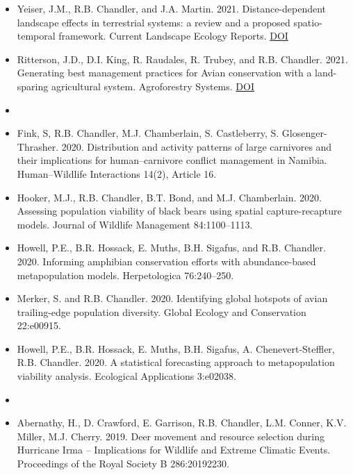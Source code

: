 \documentclass[12pt]{article}
\begin{document}
\begin{itemize}
\item Yeiser, J.M., R.B. Chandler, and
  J.A. Martin. 2021. Distance-dependent landscape effects in
  terrestrial systems: a review and a proposed spatio-temporal
  framework. Current Landscape Ecology
  Reports. \href{https://doi.org/10.1007/s40823-020-00061-w}{DOI}

\item Ritterson, J.D., D.I. King, R. Raudales, R. Trubey, and
  R.B. Chandler. 2021. Generating best management practices for Avian
  conservation with a land-sparing agricultural system. Agroforestry
  Systems. \href{https://doi.org/10.1007/s10457-020-00582-7}{DOI}
  
  
\item[] { \\}

\item Fink, S, R.B. Chandler, M.J. Chamberlain, S. Castleberry,
  S. Glosenger-Thrasher. 2020. Distribution and activity patterns of 
  large carnivores and their implications for human–carnivore conflict 
  management in Namibia. Human–Wildlife Interactions 14(2), Article 16.    

\item Hooker, M.J., R.B. Chandler, B.T. Bond, and
  M.J. Chamberlain. 2020. Assessing population viability of black
  bears using spatial capture-recapture models. Journal of Wildlife
  Management 84:1100--1113.  
  
\item Howell, P.E., B.R. Hossack, E. Muths, B.H. Sigafus, and
  R.B. Chandler. 2020. Informing amphibian conservation efforts
  with abundance-based metapopulation models. Herpetologica 76:240--250. 

\item Merker, S. and R.B. Chandler. 2020. Identifying global hotspots
  of avian trailing-edge population diversity. Global Ecology and
  Conservation 22:e00915.   

\item Howell, P.E., B.R. Hossack, E. Muths, B.H. Sigafus,
  A. Chenevert-Steffler, R.B. Chandler. 2020. A statistical 
  forecasting approach to metapopulation viability
  analysis. Ecological Applications 3:e02038. 

  
\item[] { \\}

\item Abernathy, H., D. Crawford, E. Garrison, R.B. Chandler,
  L.M. Conner, K.V. Miller, M.J. Cherry. 2019. Deer movement and
  resource selection during Hurricane Irma -- Implications for
  Wildlife and Extreme Climatic Events. Proceedings of the Royal
  Society B 286:20192230. 
  

\end{itemize}
\end{document}
